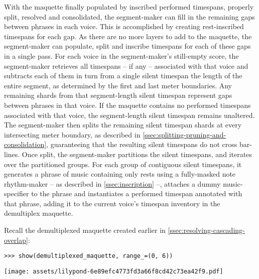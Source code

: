 With the maquette finally populated by inscribed performed timespans, properly
split, resolved and consolidated, the segment-maker can fill in the remaining
gaps between phrases in each voice. This is accomplished by creating
rest-inscribed timespans for each gap. As there are no more layers to add to
the maquette, the segment-maker can populate, split and inscribe timespans for
each of these gaps in a single pass. For each voice in the segment-maker's
still-empty score, the segment-maker retrieves all timespans -- if any --
associated with that voice and subtracts each of them in turn from a single
silent timespan the length of the entire segment, as determined by the first
and last meter boundaries. Any remaining shards from that segment-length silent
timespan represent gaps between phrases in that voice. If the maquette contains
no performed timespans associated with that voice, the segment-length silent
timespan remains unaltered. The segment-maker then splits the remaining silent
timespan shards at every intersecting meter boundary, as described in
\autoref{ssec:splitting-pruning-and-consolidation}, guaranteeing that the
resulting silent timespans do not cross bar-lines. Once split, the
segment-maker partitions the silent timespans, and iterates over the
partitioned groups. For each group of contiguous silent timespans, it generates
a phrase of music containing only rests using a fully-masked note rhythm-maker
-- as described in \autoref{ssec:inscription} --, attaches a dummy
music-specifier to the phrase and instantiates a performed timespan annotated
with that phrase, adding it to the current voice's timespan inventory in the
demultiplex maquette.

Recall the demultiplexed maquette created earlier in
\autoref{ssec:resolving-cascading-overlap}:

\begin{comment}
<abjad>
show(demultiplexed_maquette, range_=(0, 6))
</abjad>
\end{comment}

\begin{abjadbookoutput}
\begin{singlespacing}
\vspace{-0.5\baselineskip}
\begin{verbatim}
>>> show(demultiplexed_maquette, range_=(0, 6))
\end{verbatim}
\noindent\texttt{[image: assets/lilypond-6e89efc4773fd3a66f8cd42c73ea42f9.pdf]}
\end{singlespacing}
\end{abjadbookoutput}

